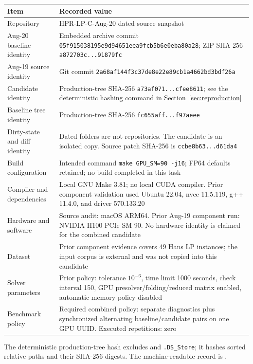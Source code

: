 \documentclass[10pt,a4paper]{article}
\newcommand{\ReportRepository}{HPR-LP-C-Aug-20 dated source snapshot}
\begin{document}
\begin{tabularx}{\textwidth}{@{}P{0.31\textwidth}Y@{}}
\toprule
\textbf{Item} & \textbf{Recorded value}\\
\midrule
Repository & \ReportRepository\\
Aug-20 baseline identity & Embedded archive commit \texttt{05f915038195e9d94651eea9fcb5b6e0eba80a28}; ZIP SHA-256 \texttt{a872703c...91879fc}\\
Aug-19 source identity & Git commit \texttt{2a68af144f3c37de8e22e89cb1a4662bd3bdf26a}\\
Candidate identity & Production-tree SHA-256 \texttt{a73af071...cfee8611}; see the deterministic hashing command in Section~\ref{sec:reproduction}\\
Baseline tree identity & Production-tree SHA-256 \texttt{fc655aff...f97aeee}\\
Dirty-state and diff identity & Dated folders are not repositories.  The candidate is an isolated copy.  Source patch SHA-256 is \texttt{ccbe8b63...d61da4}\\
Build configuration & Intended command \texttt{make GPU\_SM=90 -j16}; FP64 defaults retained; no build completed in this task\\
Compiler and dependencies & Local GNU Make 3.81; no local CUDA compiler.  Prior component validation used Ubuntu 22.04, nvcc 11.5.119, g++ 11.4.0, and driver 570.133.20\\
Hardware and software & Source audit: macOS ARM64.  Prior Aug-19 component run: NVIDIA H100 PCIe SM 90.  No hardware identity is claimed for the combined candidate\\
Dataset & Prior component evidence covers 49 Hans LP instances; the input corpus is external and was not copied into this candidate\\
Solver parameters & Prior policy: tolerance $10^{-6}$, time limit 1000 seconds, check interval 150, GPU presolver/folding/reduced matrix enabled, automatic memory policy disabled\\
Benchmark policy & Required combined policy: separate diagnostics plus synchronized alternating baseline/candidate pairs on one GPU UUID.  Executed repetitions: zero\\
\bottomrule
\end{tabularx}

The deterministic production-tree hash excludes 
and \texttt{.DS\_Store}; it hashes sorted relative paths and their SHA-256
digests.  The machine-readable record is
.
\end{document}
